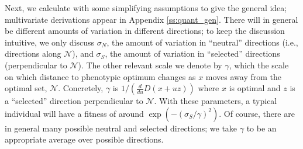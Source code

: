 \documentclass{article}
\newcommand{\1}{\mathbbm{1}}
\newcommand{\allS}{\mathcal{N}}
\begin{document}

Next, we calculate with some simplifying assumptions to give the general idea;
multivariate derivations appear in Appendix \ref{ss:quant_gen}.
There will in general be different amounts of variation in different directions;
to keep the discussion intuitive, we only discuss $\sigma_N$, the amount of variation in ``neutral'' directions
(i.e., directions along $\allS$),
and $\sigma_S$, the amount of variation in ``selected'' directions (perpendicular to $\allS$).
The other relevant scale we denote by $\gamma$,
which the scale on which distance to phenotypic optimum changes as $x$ moves away from the optimal set, $\allS$.
Concretely, $\gamma$ is
$1/(\frac{d}{du}D(x+uz))$ 
where $x$ is optimal and $z$ is a ``selected'' direction perpendicular to $\allS$.
With these parameters, a typical individual will have a fitness of around $\exp(-(\sigma_S/\gamma)^2)$.
Of course, there are in general many possible neutral and selected directions;
we take $\gamma$ to be an appropriate average over possible directions.
\end{document}
